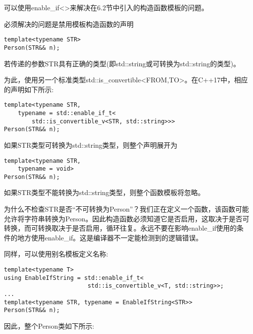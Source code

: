 可以使用enable\_if<>来解决在6.2节中引入的构造函数模板的问题。

必须解决的问题是禁用模板构造函数的声明

\begin{lstlisting}[style=styleCXX]
template<typename STR>
Person(STR&& n);
\end{lstlisting}

若传递的参数STR具有正确的类型(即std::string或可转换为std::string的类型)。

为此，使用另一个标准类型std::is\_convertible<FROM,TO>。在C++17中，相应的声明如下所示:

\begin{lstlisting}[style=styleCXX]
template<typename STR,
	typename = std::enable_if_t<
		std::is_convertible_v<STR, std::string>>>
Person(STR&& n);
\end{lstlisting}

如果STR类型可转换为std::string类型，则整个声明展开为

\begin{lstlisting}[style=styleCXX]
template<typename STR,
	typename = void>
Person(STR&& n);
\end{lstlisting}

如果STR类型不能转换为std::string类型，则整个函数模板将忽略。

\begin{tcolorbox}[colback=webgreen!5!white,colframe=webgreen!75!black]
\hspace*{0.75cm}为什么不检查STR是否“不可转换为Person”？我们正在定义一个函数，该函数可能允许将字符串转换为Person。因此构造函数必须知道它是否启用，这取决于是否可转换，而可转换取决于是否启用，循环往复。永远不要在影响enable\_if使用的条件的地方使用enable\_if。这是编译器不一定能检测到的逻辑错误。
\end{tcolorbox}

同样，可以使用别名模板定义名称:

\begin{lstlisting}[style=styleCXX]
template<typename T>
using EnableIfString = std::enable_if_t<
						std::is_convertible_v<T, std::string>>;
...
template<typename STR, typename = EnableIfString<STR>>
Person(STR&& n);
\end{lstlisting}

因此，整个Person类如下所示:

